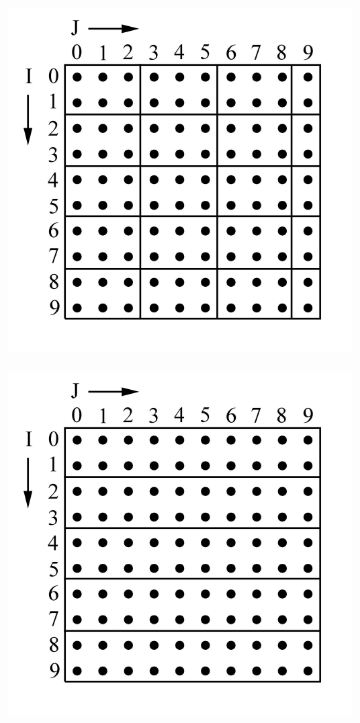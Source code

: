 \begin{figure}
\centering
\begin{subfigure}{0.45\textwidth}
  \centering
  \includegraphics[width=\textwidth]{Figures/simple.jpg}
  \caption{}
  \label{fig:simple}
\end{subfigure} 
\begin{subfigure}{0.45\textwidth}
  \centering
  \includegraphics[width=\textwidth]{Figures/selective.jpg}

\end{subfigure}
\end{figure}
